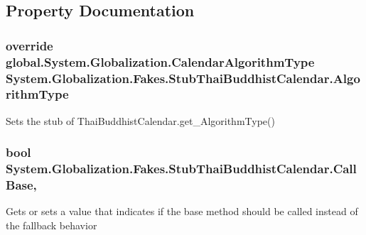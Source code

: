 \subsection{Property Documentation}
\hypertarget{class_system_1_1_globalization_1_1_fakes_1_1_stub_thai_buddhist_calendar_a44c97f2be82fd6e8fc902fa0caa0e489}{
\subsubsection[{Algorithm\-Type}]{\setlength{\rightskip}{0pt plus 5cm}override global.\-System.\-Globalization.\-Calendar\-Algorithm\-Type System.\-Globalization.\-Fakes.\-Stub\-Thai\-Buddhist\-Calendar.\-Algorithm\-Type\hspace{0.3cm}{\ttfamily [get]}}}\label{class_system_1_1_globalization_1_1_fakes_1_1_stub_thai_buddhist_calendar_a44c97f2be82fd6e8fc902fa0caa0e489}


Sets the stub of Thai\-Buddhist\-Calendar.\-get\-\_\-\-Algorithm\-Type()

\hypertarget{class_system_1_1_globalization_1_1_fakes_1_1_stub_thai_buddhist_calendar_a5bad612c3d8fc5d4f3395f86e306eaed}{
\subsubsection[{Call\-Base}]{\setlength{\rightskip}{0pt plus 5cm}bool System.\-Globalization.\-Fakes.\-Stub\-Thai\-Buddhist\-Calendar.\-Call\-Base\hspace{0.3cm}{\ttfamily [get]}, {\ttfamily [set]}}}\label{class_system_1_1_globalization_1_1_fakes_1_1_stub_thai_buddhist_calendar_a5bad612c3d8fc5d4f3395f86e306eaed}


Gets or sets a value that indicates if the base method should be called instead of the fallback behavior

